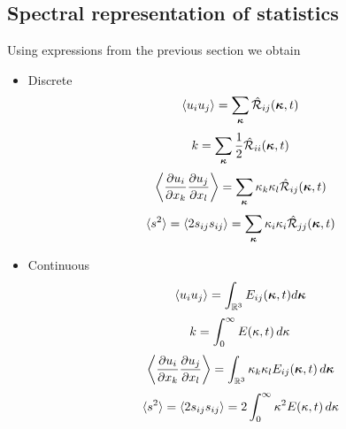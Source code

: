 \documentclass[oneside,a4paper,11pt]{report}
\begin{document}
\subsection{Spectral representation of statistics}
Using expressions from the previous section we obtain
\begin{itemize}
\item Discrete
\begin{equation}
\langle u_i u_j \rangle = \sum_{\boldsymbol\kappa} \hat{\mathcal{R}}_{ij}(\boldsymbol\kappa,t)
\end{equation} 
\begin{equation}
k = \sum_{\boldsymbol\kappa} \frac{1}{2} \hat{\mathcal{R}}_{ii}(\boldsymbol\kappa,t) 
\end{equation}
\begin{equation}
\left < \frac{ \partial u_i }{ \partial x_k} \frac{ \partial u_j }{ \partial x_l } \right > = \sum_{\boldsymbol\kappa} \kappa_k \kappa_l \hat{\mathcal{R}}_{ij}(\boldsymbol\kappa,t)
\end{equation}
\begin{equation}
\langle s^2 \rangle = \langle 2 s_{ij} s_{ij} \rangle = \sum_{\boldsymbol\kappa} \kappa_i \kappa_i \hat{\mathcal{R}}_{jj}(\boldsymbol\kappa,t)
\end{equation}
\item Continuous
\begin{equation}
\langle u_i u_j \rangle = \int_{\mathbb{R}^3} E_{ij}(\boldsymbol\kappa,t) d\boldsymbol\kappa
\end{equation} 
\begin{equation}
k =\int_0^\infty E(\kappa,t) \, d\kappa
\end{equation}
\begin{equation}
\left < \frac{ \partial u_i }{ \partial x_k} \frac{ \partial u_j }{ \partial x_l } \right > = \int_{{\mathbb{R}^3}} \kappa_k \kappa_l E_{ij}(\boldsymbol\kappa,t) \, d\boldsymbol\kappa
\end{equation}
\begin{equation}
\label{eq:strain_mag_spectral}
\langle s^2 \rangle = \langle 2 s_{ij} s_{ij} \rangle = 2 \int_{0}^\infty \kappa^2 E(\kappa,t) \, d\kappa
\end{equation}
\end{itemize}



\end{document}
